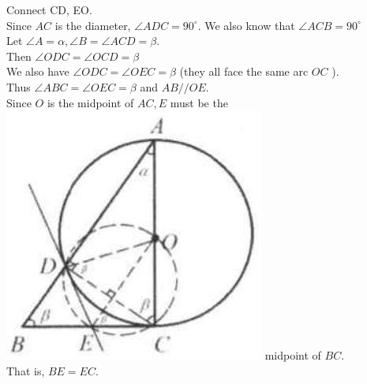 \documentclass{article}
\begin{document}
Connect CD, EO.\\
Since \(A C\) is the diameter, \(\angle A D C=90^{\circ}\). We also know that \(\angle A C B=90^{\circ}\)\\
Let \(\angle A=\alpha, \angle B=\angle A C D=\beta\).\\
Then \(\angle O D C=\angle O C D=\beta\)\\
We also have \(\angle O D C=\angle O E C=\beta\) (they all face the same arc \(O C\) ).\\
Thus \(\angle A B C=\angle O E C=\beta\) and \(A B / / O E\).\\
Since \(O\) is the midpoint of \(A C, E\) must be the\\
\includegraphics[width=\textwidth]{images/reasoning_image_1.jpg} midpoint of \(B C\).\\
That is, \(B E=E C\).
\end{document}
